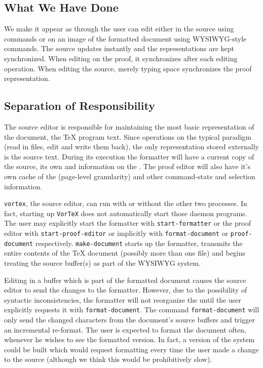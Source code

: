 \subsection{What We Have Done}

We make it appear as through the user can edit either in the source
using {\EMACS} commands or on an image of the formatted document using
WYSIWYG-style commands.
The source updates instantly and the representations are kept
synchronized.  When editing on the proof, it synchronizes after each
editing operation.  When editing the source, merely typing space
synchronizes the proof representation.

\subsection{Separation of Responsibility}

The source editor is responsible for maintaining the most basic representation
of the document, the {\TeX} program text.  Since {\VorTeX} operations on the
typical {\UNIX} paradigm (read in files, edit and write them back), the only
representation stored externally is the source text.  During its execution
the formatter will have a current copy of the source, its own {\IRI} and
information on the {\IRT}.  The proof editor will also have it's own cache
of the {\IRT} (page-level granularity) and other command-state and selection
information.

\medskip
\centerline{}

{\tt vortex}, the source editor, can run with or without the other two
processes.  In fact, starting up {\tt VorTeX} does not automatically start
those daemon programs.  The user may explicitly start the formatter with
{\tt start-formatter} or the proof editor with {\tt start-proof-editor} or
implicitly with {\tt format-document} or {\tt proof-document} respectively.
{\tt make-document} starts up the formatter, transmits the entire contents
of the {\TeX} document (possibly more than one file) and begins treating the
source buffer(s) as part of the WYSIWYG system.

Editing in a buffer which is part of the formatted document causes the
source editor to send the changes to the formatter.  However, due to the
possibility of syntactic inconsistencies, the formatter will not reorganize
the {\IRI} until the user explicitly requests it with {\tt format-document}.
The command {\tt format-document} will only send the changed characters from
the document's source buffers and trigger an incremental re-format.  The
user is expected to format the document often, whenever he wishes to see the
formatted version.  In fact, a version of the system could be built which
would request formatting every time the user made a change to the source
(although we think this would be prohibitively slow).

